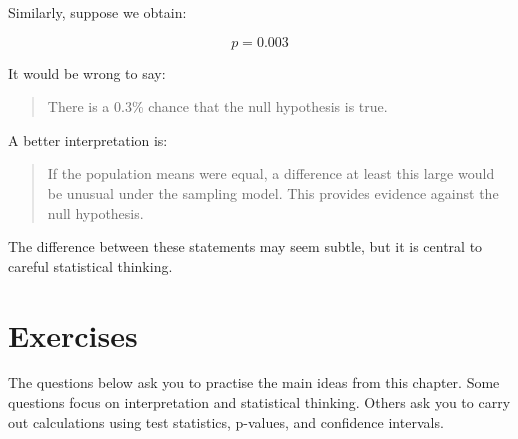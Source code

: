 \documentclass[
  letterpaper,
  DIV=11,
  numbers=noendperiod]{scrreprt}
\begin{document}
Similarly, suppose we obtain:

\[
p = 0.003
\]

It would be wrong to say:

\begin{quote}
There is a 0.3\% chance that the null hypothesis is true.
\end{quote}

A better interpretation is:

\begin{quote}
If the population means were equal, a difference at least this large
would be unusual under the sampling model. This provides evidence
against the null hypothesis.
\end{quote}

The difference between these statements may seem subtle, but it is
central to careful statistical thinking.

\section{Exercises}\label{exercises-4}

The questions below ask you to practise the main ideas from this
chapter. Some questions focus on interpretation and statistical
thinking. Others ask you to carry out calculations using test
statistics, p-values, and confidence intervals.
\end{document}
